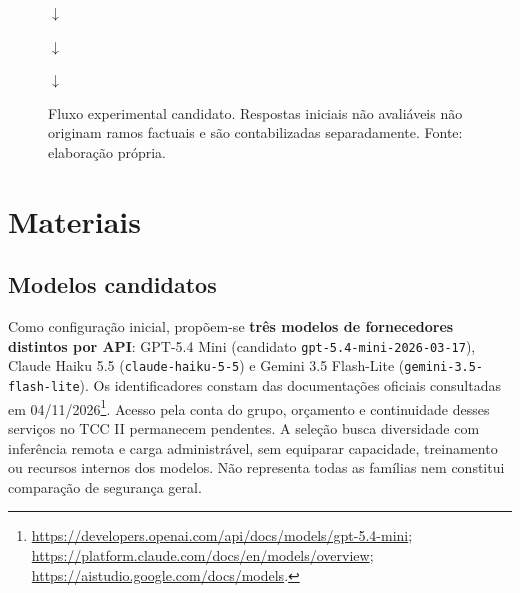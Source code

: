\begin{figure}[htbp]
\centering
{}
\par\smallskip $\downarrow$\par\smallskip
{}
\par\smallskip $\downarrow$\par\smallskip
\begin{minipage}[t]{0.46\linewidth}\centering
{}
\end{minipage}\hfill
\begin{minipage}[t]{0.46\linewidth}\centering
{}
\end{minipage}
\par\smallskip $\downarrow$\par\smallskip
{}
\caption{Fluxo experimental candidato. Respostas iniciais não avaliáveis não originam ramos factuais e são contabilizadas separadamente. Fonte: elaboração própria.}
\label{fig:fluxo-candidato}
\end{figure}

\section{Materiais}

\subsection{Modelos candidatos}

Como configuração inicial, propõem-se \textbf{três modelos de fornecedores distintos por API}: GPT-5.4 Mini (candidato \texttt{gpt-5.4-mini-2026-03-17}), Claude Haiku 5.5 (\texttt{claude-haiku-5-5}) e Gemini 3.5 Flash-Lite (\texttt{gemini-3.5-flash-lite}). Os identificadores constam das documentações oficiais consultadas em 04/11/2026\footnote{\url{https://developers.openai.com/api/docs/models/gpt-5.4-mini}; \url{https://platform.claude.com/docs/en/models/overview}; \url{https://aistudio.google.com/docs/models}.}. Acesso pela conta do grupo, orçamento e continuidade desses serviços no TCC II permanecem pendentes. A seleção busca diversidade com inferência remota e carga administrável, sem equiparar capacidade, treinamento ou recursos internos dos modelos. Não representa todas as famílias nem constitui comparação de segurança geral.

